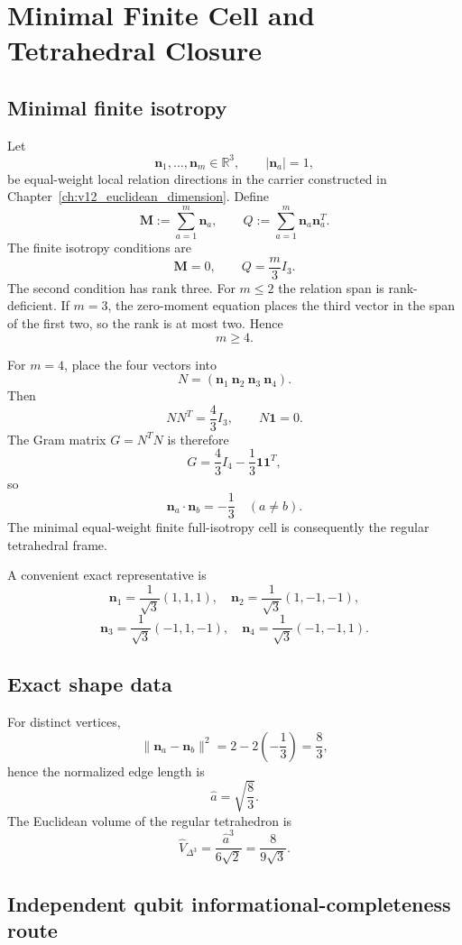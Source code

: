 \chapter{Minimal Finite Cell and Tetrahedral Closure}
\label{ch:v12_tetrahedral_closure}

\section{Minimal finite isotropy}

Let
\[
\mathbf n_1,\ldots,\mathbf n_m\in\mathbb R^3,
\qquad
|\mathbf n_a|=1,
\]
be equal-weight local relation directions in the carrier constructed in
Chapter~\ref{ch:v12_euclidean_dimension}.  Define
\[
\mathbf M:=\sum_{a=1}^{m}\mathbf n_a,
\qquad
Q:=\sum_{a=1}^{m}\mathbf n_a\mathbf n_a^T.
\]
The finite isotropy conditions are
\[
\boxed{\mathbf M=0},
\qquad
\boxed{Q=\frac m3 I_3}.
\]
The second condition has rank three.  For \(m\le2\) the relation span is
rank-deficient.  If \(m=3\), the zero-moment equation places the third vector in
the span of the first two, so the rank is at most two.  Hence
\[
\boxed{m\ge4.}
\]

For \(m=4\), place the four vectors into
\[
N=(\mathbf n_1\ \mathbf n_2\ \mathbf n_3\ \mathbf n_4).
\]
Then
\[
NN^T=\frac43I_3,
\qquad
N\mathbf1=0.
\]
The Gram matrix \(G=N^TN\) is therefore
\[
\boxed{
G
=
\frac43I_4-\frac13\mathbf1\mathbf1^T,
}
\]
so
\[
\boxed{
\mathbf n_a\cdot\mathbf n_b
=
-\frac13
\quad(a\neq b).
}
\]
The minimal equal-weight finite full-isotropy cell is consequently the regular
tetrahedral frame.

A convenient exact representative is
\[
\mathbf n_1=\frac1{\sqrt3}(1,1,1),\quad
\mathbf n_2=\frac1{\sqrt3}(1,-1,-1),
\]
\[
\mathbf n_3=\frac1{\sqrt3}(-1,1,-1),\quad
\mathbf n_4=\frac1{\sqrt3}(-1,-1,1).
\]

\section{Exact shape data}

For distinct vertices,
\[
\|\mathbf n_a-\mathbf n_b\|^2
=
2-2\left(-\frac13\right)
=
\frac83,
\]
hence the normalized edge length is
\[
\boxed{\hat a=\sqrt{\frac83}}.
\]
The Euclidean volume of the regular tetrahedron is
\[
\boxed{
\hat V_{\Delta^3}
=
\frac{\hat a^3}{6\sqrt2}
=
\frac{8}{9\sqrt3}.
}
\]

\section{Independent qubit informational-completeness route}


